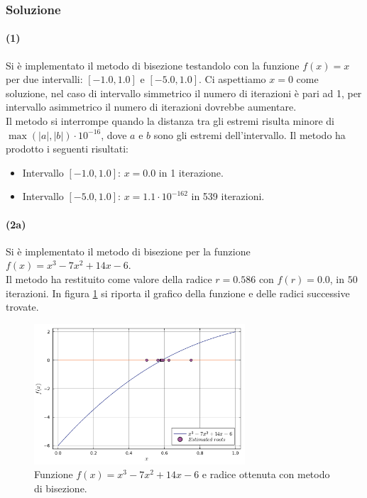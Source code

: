 \documentclass[letterpaper, 12pt]{article}
\numberwithin{equation}{section}    %
\begin{document}
\subsubsection{Soluzione}
\paragraph{(1)}Si è implementato il metodo di bisezione testandolo con la funzione $f(x)=x$ per due 
intervalli: $[-1.0, 1.0]$ e $[-5.0, 1.0]$. Ci aspettiamo 
$x = 0$ come soluzione, nel caso di intervallo simmetrico il numero di iterazioni 
è pari ad 1, per intervallo asimmetrico il numero di iterazioni dovrebbe aumentare. \\
Il metodo si interrompe quando la distanza tra gli estremi risulta minore di $\max(|a|,|b|) \cdot 10^{-16}$,
dove $a$ e $b$ sono gli estremi dell'intervallo. Il metodo ha prodotto i seguenti risultati:
\begin{itemize}
    \item Intervallo $[-1.0, 1.0]$: $x = 0.0$ in 1 iterazione.
    \item Intervallo $[-5.0, 1.0]$: $x = 1.1 \cdot 10^{-162}$ in 539 iterazioni.
\end{itemize}

\paragraph{(2a)}Si è implementato il metodo di bisezione per la funzione $f(x) = x^3 - 7x^2 + 14x - 6$. \\
Il metodo ha restituito come valore della radice $r = 0.586$ con $f(r) = 0.0$, in $50$ iterazioni. In
figura \ref{fig:es3_2_2_1} si riporta il grafico della funzione e delle radici successive trovate.
\begin{figure}[!ht]
    \centering
    \includegraphics[width=0.7\textwidth]{3221.pdf}
    \caption{Funzione $f(x) = x^3 - 7x^2 + 14x - 6$ e radice ottenuta con metodo di bisezione.}
    \label{fig:es3_2_2_1}
\end{figure} 
\end{document}

